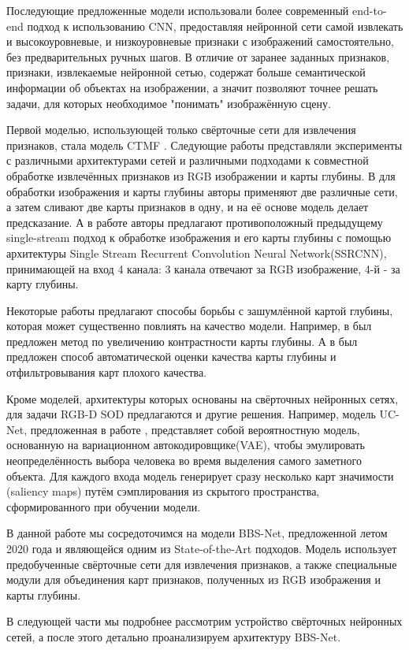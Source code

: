 Последующие предложенные модели использовали более современный end-to-end подход к использованию CNN, предоставляя нейронной сети самой извлекать
и высокоуровневые, и низкоуровневые признаки с изображений самостоятельно, без предварительных ручных шагов.
В отличие от заранее заданных признаков, признаки, извлекаемые нейронной сетью, содержат больше семантической информации об объектах на изображении, а значит
позволяют точнее решать задачи, для которых необходимое "понимать" изображённую сцену.

Первой моделью, использующей только свёрточные сети для извлечения признаков, стала модель CTMF \cite{CNNs-Based}.
Следующие работы представляли эксперименты с различными архитектурами сетей и различными подходами
к совместной обработке извлечённых признаков из RGB изображении и карты глубины. В \cite{Progressively} для обработки
изображения и карты глубины авторы применяют две различные сети, а затем сливают две карты признаков в одну, и
на её основе модель делает предсказание. А в работе \cite{Single-Stream} авторы предлагают противоположный предыдущему
single-stream подход к обработке изображения и его карты глубины с помощью архитектуры Single Stream Recurrent Convolution Neural Network(SSRCNN),
принимающей на вход 4 канала: 3 канала отвечают за RGB изображение, 4-й - за карту глубины.

Некоторые работы предлагают способы борьбы с зашумлённой картой глубины, которая может существенно повлиять на качество модели.
Например, в \cite{Contrast} был предложен метод по увеличению контрастности карты глубины. А в \cite{Rethinking-RGBD} был предложен
способ автоматической оценки качества карты глубины и отфильтровывания карт плохого качества.

Кроме моделей, архитектуры которых основаны на свёрточных нейронных сетях, для задачи RGB-D SOD предлагаются и другие решения.
Например, модель UC-Net, предложенная в работе \cite{UC-Net}, представляет собой вероятностную модель, основанную на
вариационном автокодировщике(VAE), чтобы эмулировать неопределённость выбора человека во время выделения самого заметного объекта.
Для каждого входа модель генерирует сразу несколько карт значимости (saliency maps) путём сэмплирования из скрытого пространства,
сформированного при обучении модели.


В данной работе мы сосредоточимся на модели BBS-Net\cite{BBS}, предложенной летом 2020 года и являющейся одним из State-of-the-Art подходов.
Модель использует предобученные свёрточные сети для извлечения признаков, а также специальные модули для объединения карт признаков,
полученных из RGB изображения и карты глубины.

В следующей части мы подробнее рассмотрим устройство свёрточных нейронных сетей, а после этого детально проанализируем архитектуру BBS-Net\cite{BBS}.